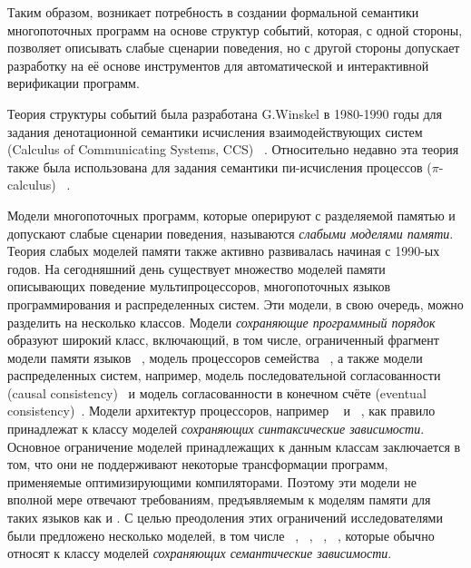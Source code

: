 Таким образом, возникает потребность в создании формальной семантики 
многопоточных программ на основе структур событий, 
которая, с одной стороны, позволяет описывать слабые сценарии поведения, 
но с другой стороны допускает разработку на её основе 
инструментов для автоматической и интерактивной верификации программ. 

{\progress}

Теория структуры событий была разработана G.Winskel
в 1980-1990 годы для задания денотационной семантики 
исчисления взаимодействующих систем (Calculus of Communicating Systems, CCS)%
~\autocite{Winskel:ICALP1982}.
Относительно недавно эта теория также была использована 
для задания семантики пи-исчисления процессов ($\pi$-calculus)%
~\autocite{Varacca-Nobuko:TCS10,Crafa-al:FSCCS12,Hildebrandt-al:LATA2017}.

Модели многопоточных программ, которые оперируют с разделяемой памятью 
и допускают слабые сценарии поведения, называются \emph{слабыми моделями памяти}.
Теория слабых моделей памяти также активно развивалась начиная с 1990-ых годов. 
На сегодняшний день существует множество моделей памяти 
описывающих поведение мультипроцессоров, 
многопоточных языков программирования и распределенных систем. 
Эти модели, в свою очередь, можно разделить на несколько классов. 
Модели \emph{сохраняющие программный порядок} образуют широкий класс, 
включающий, в том числе, ограниченный фрагмент модели памяти языков \CPP~\autocite{Lahav-al:PLDI17},
модель \TSO процессоров семейства \Intel~\autocite{Sewell-al:CACM10},
а также модели распределенных систем, 
например, модель последовательной согласованности (causal consistency)~\autocite{Lahav-Boker:PLDI2020}
и модель согласованности в конечном счёте (eventual consistency)~\autocite{Jagadeesan-al:ESOP2018}.
Модели архитектур процессоров, например ~\autocite{Pulte-al:POPL18} 
и \POWER~\autocite{Sarkar-al:PLDI11}, 
как правило принадлежат к классу моделей \emph{сохраняющих синтаксические зависимости}. 
Основное ограничение моделей принадлежащих к данным классам заключается в том, 
что они не поддерживают некоторые трансформации программ, 
применяемые оптимизирующими компиляторами. 
Поэтому эти модели не вполной мере отвечают требованиям, 
предъявляемым к моделям памяти для таких языков как \CPP и \Java. 
С целью преодоления этих ограничений исследователями 
были предложено несколько моделей, в том числе 
\Prm~\autocite{Kang-al:POPL17}, \Wkm~\autocite{Chakraborty-Vafeiadis:POPL19}, 
\MRD~\autocite{Paviotti-al:ESOP20}, \PwP~\autocite{Jagadeesan-al:OOPSLA2020},
которые обычно относят к классу моделей \emph{сохраняющих семантические зависимости}.

